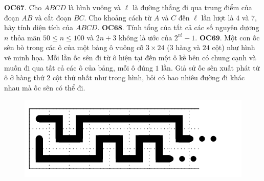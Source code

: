 \begin{multicols}{2}
	\vskip 0.1cm
	{\bf\color{cackithi} OC$\pmb{67.}$} Cho $ABCD$ là hình vuông và $\ell$ là đường thẳng đi qua trung điểm của đoạn $AB$ và cắt  đoạn $BC$. Cho khoảng cách từ $A$ và $C$ đến $\ell$ lần lượt là $4$ và $7$, hãy tính diện tích của $ABCD.$
	\vskip 0.1cm
	{\bf\color{cackithi} OC$\pmb{68.}$} Tính tổng của tất cả các số nguyên dương $n$ thỏa mãn $50 \le n \le 100$ và $2n + 3$ không là ước của $2^{n!} -1.$
	\vskip 0.1cm
	{\bf\color{cackithi} OC$\pmb{69.}$} Một con ốc sên bò trong các ô của một bảng ô vuông cỡ $3\times 24$ ($3$ hàng và $24$ cột) như hình vẽ minh họa. Mỗi lần ốc sên đi từ ô hiện tại đến một ô kề bên có chung cạnh và muốn đi qua tất cả các ô của bảng, mỗi ô đúng $1$ lần. Giả sử ốc sên xuất phát từ ô ở hàng thứ $2$ cột thứ nhất như trong hình, hỏi có bao nhiêu đường đi khác nhau mà ốc sên có thể đi.
	\begin{figure}[H]
		\vspace*{-5pt}
		\centering
		\captionsetup{labelformat= empty, justification=centering}
		\includegraphics[width= 1\linewidth]{OC69}
		\vspace*{-10pt}
	\end{figure}	
\end{multicols}
